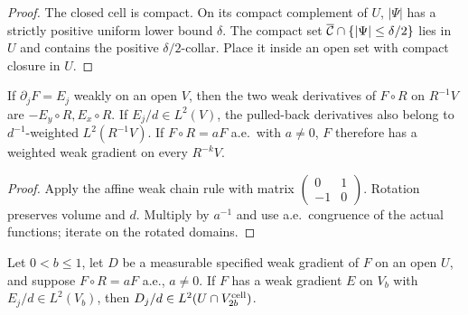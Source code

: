 \begin{proof}
\leanok
{}
The closed cell is compact. On its compact complement of $U$, $|\Psi|$
has a strictly positive uniform lower bound $\delta$.
The compact set
$\overline{\mathcal{C}}\cap\{|\Psi|\le\delta/2\}$ lies in $U$ and contains the
positive $\delta/2$-collar. Place it inside an open set with compact closure in $U$.
\end{proof}

\begin{lemma}
\label{lem:weighted-gradient-rotation}
\leanok
If $\partial_jF=E_j$ weakly on an open $V$, then the two weak
derivatives of $F\circ R$ on $R^{-1}V$ are $-E_y\circ R,E_x\circ R$.
If $E_j/d\in L^2(V)$, the pulled-back derivatives also belong to
$d^{-1}$-weighted $L^2(R^{-1}V)$.
If $F\circ R=aF$ a.e.\ with $a\ne0$, $F$ therefore has a weighted
weak gradient on every $R^{-k}V$.
\end{lemma}

\begin{proof}
\leanok
Apply the affine weak chain rule with matrix
$\left(\begin{smallmatrix}0&1\\-1&0\end{smallmatrix}\right)$.
Rotation preserves volume and $d$. Multiply by $a^{-1}$ and use a.e.\
congruence of the actual functions; iterate on the rotated domains.
\end{proof}

\begin{lemma}
\label{lem:weighted-gradient-cell-cover}
\leanok
Let $0<b\le1$, let $D$ be a measurable specified weak gradient of $F$
on an open $U$, and suppose $F\circ R=aF$ a.e., $a\ne0$.
If $F$ has a weak gradient $E$ on $V_b$ with $E_j/d\in L^2(V_b)$,
then $D_j/d\in L^2(U\cap V_{2b}^{\rm cell})$.
\end{lemma}

